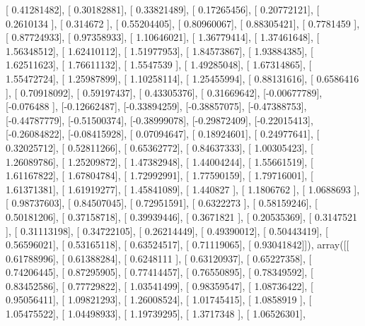 \documentclass{article}
\begin{document}
       [ 0.41281482],
       [ 0.30182881],
       [ 0.33821489],
       [ 0.17265456],
       [ 0.20772121],
       [ 0.2610134 ],
       [ 0.314672  ],
       [ 0.55204405],
       [ 0.80960067],
       [ 0.88305421],
       [ 0.7781459 ],
       [ 0.87724933],
       [ 0.97358933],
       [ 1.10646021],
       [ 1.36779414],
       [ 1.37461648],
       [ 1.56348512],
       [ 1.62410112],
       [ 1.51977953],
       [ 1.84573867],
       [ 1.93884385],
       [ 1.62511623],
       [ 1.76611132],
       [ 1.5547539 ],
       [ 1.49285048],
       [ 1.67314865],
       [ 1.55472724],
       [ 1.25987899],
       [ 1.10258114],
       [ 1.25455994],
       [ 0.88131616],
       [ 0.6586416 ],
       [ 0.70918092],
       [ 0.59197437],
       [ 0.43305376],
       [ 0.31669642],
       [-0.00677789],
       [-0.076488  ],
       [-0.12662487],
       [-0.33894259],
       [-0.38857075],
       [-0.47388753],
       [-0.44787779],
       [-0.51500374],
       [-0.38999078],
       [-0.29872409],
       [-0.22015413],
       [-0.26084822],
       [-0.08415928],
       [ 0.07094647],
       [ 0.18924601],
       [ 0.24977641],
       [ 0.32025712],
       [ 0.52811266],
       [ 0.65362772],
       [ 0.84637333],
       [ 1.00305423],
       [ 1.26089786],
       [ 1.25209872],
       [ 1.47382948],
       [ 1.44004244],
       [ 1.55661519],
       [ 1.61167822],
       [ 1.67804784],
       [ 1.72992991],
       [ 1.77590159],
       [ 1.79716001],
       [ 1.61371381],
       [ 1.61919277],
       [ 1.45841089],
       [ 1.440827  ],
       [ 1.1806762 ],
       [ 1.0688693 ],
       [ 0.98737603],
       [ 0.84507045],
       [ 0.72951591],
       [ 0.6322273 ],
       [ 0.58159246],
       [ 0.50181206],
       [ 0.37158718],
       [ 0.39939446],
       [ 0.3671821 ],
       [ 0.20535369],
       [ 0.3147521 ],
       [ 0.31113198],
       [ 0.34722105],
       [ 0.26214449],
       [ 0.49390012],
       [ 0.50443419],
       [ 0.56596021],
       [ 0.53165118],
       [ 0.63524517],
       [ 0.71119065],
       [ 0.93041842]]), array([[ 0.61788996],
       [ 0.61388284],
       [ 0.6248111 ],
       [ 0.63120937],
       [ 0.65227358],
       [ 0.74206445],
       [ 0.87295905],
       [ 0.77414457],
       [ 0.76550895],
       [ 0.78349592],
       [ 0.83452586],
       [ 0.77729822],
       [ 1.03541499],
       [ 0.98359547],
       [ 1.08736422],
       [ 0.95056411],
       [ 1.09821293],
       [ 1.26008524],
       [ 1.01745415],
       [ 1.0858919 ],
       [ 1.05475522],
       [ 1.04498933],
       [ 1.19739295],
       [ 1.3717348 ],
       [ 1.06526301],
\end{document}
